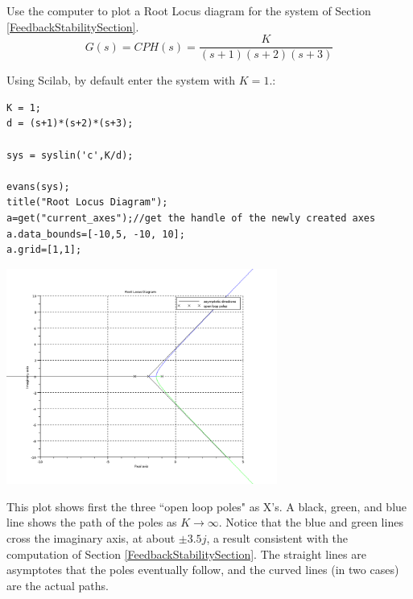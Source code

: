 \begin{ExampleSmall}
Use the computer to plot a Root Locus diagram for the system of Section \ref{FeedbackStabilitySection}.
\[
G(s)= CPH(s) = \frac{K}{(s+1)(s+2)(s+3)}
\]


Using Scilab, by default enter the system with $K=1$.:

\begin{verbatim}
K = 1;
d = (s+1)*(s+2)*(s+3);

sys = syslin('c',K/d);

evans(sys);
title("Root Locus Diagram");
a=get("current_axes");//get the handle of the newly created axes
a.data_bounds=[-10,5, -10, 10];
a.grid=[1,1];
\end{verbatim}

\includegraphics[width=3.5in]{figs07/rlexample1a.png}

This plot shows first the three ``open loop poles" as X's.  A black, green, and blue line shows the path of the poles as $K\to\infty$. Notice that the blue and green lines cross the imaginary axis, at about $\pm3.5j$, a result consistent with the computation of Section \ref{FeedbackStabilitySection}.
The straight lines are asymptotes that the poles eventually follow, and the curved lines (in two cases) are the actual paths.
\end{ExampleSmall}
\vspace{0.75in}


